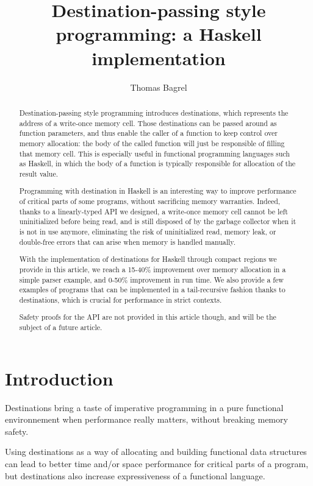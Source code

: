 \documentclass[english]{jflart}
\title{Destination-passing style programming: a Haskell implementation}
\author[1]{Thomas Bagrel}
\affil[1]{INRIA/LORIA, Vand\oe{}uvre-lès-Nancy, 54500, France}
\affil[2]{TWEAG, Paris, 75012, France}
\begin{document}
\maketitle

\begin{abstract}
Destination-passing style programming introduces destinations, which represents the address of a write-once memory cell. Those destinations can be passed around as function parameters, and thus enable the caller of a function to keep control over memory allocation: the body of the called function will just be responsible of filling that memory cell. This is especially useful in functional programming languages such as Haskell, in which the body of a function is typically responsible for allocation of the result value.

Programming with destination in Haskell is an interesting way to improve performance of critical parts of some programs, without sacrificing memory warranties. Indeed, thanks to a linearly-typed API we designed, a write-once memory cell cannot be left uninitialized before being read, and is still disposed of by the garbage collector when it is not in use anymore, eliminating the risk of uninitialized read, memory leak, or double-free errors that can arise when memory is handled manually.

With the implementation of destinations for Haskell through compact regions we provide in this article, we reach a 15-40\% improvement over memory allocation in a simple parser example, and 0-50\% improvement in run time. We also provide a few examples of programs that can be implemented in a tail-recursive fashion thanks to destinations, which is crucial for performance in strict contexts.

Safety proofs for the API are not provided in this article though, and will be the subject of a future article.
\end{abstract}

\tableofcontents{}

\section{Introduction}

Destinations bring a taste of imperative programming in a pure functional environnement when performance really matters, without breaking memory safety.

Using destinations as a way of allocating and building functional data structures can lead to better time and/or space performance for critical parts of a program, but destinations also increase expressiveness of a functional language.
\end{document}
